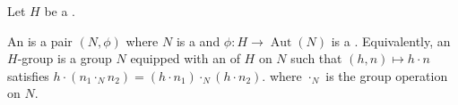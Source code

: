 \begin{definition}[$H$-group] \label{definition:H_group_for_a_fixed_group}
    Let $H$ be a .

    An  is a pair $(N, \phi)$ where $N$ is a  and $\phi: H \to \operatorname{Aut}(N)$ is a . Equivalently, an $H$-group is a group $N$ equipped with an  of $H$ on $N$ such that $(h,n) \mapsto h \cdot n$ satisfies $h \cdot (n_1 \cdot_N n_2) = (h \cdot n_1) \cdot_N (h \cdot n_2)$. 
    where $\cdot_N$ is the group operation on $N$.
\end{definition}
